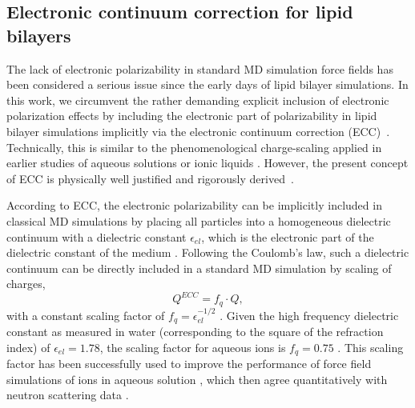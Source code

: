 \documentclass[aip,jcp,twocolumn]{revtex4}
\begin{document}
\subsection{Electronic continuum correction for lipid bilayers}\label{section:ecc}
The lack of electronic polarizability in standard MD simulation
force fields has been considered a serious issue since the early days of
lipid bilayer simulations.
In this work, we circumvent the rather demanding explicit inclusion
of electronic polarization effects \cite{lucas12,chowdhary13} by
including the electronic part of polarizability in lipid
bilayer simulations implicitly via 
the electronic continuum correction (ECC)~\cite{leontyev11}. 
Technically, this is similar to the phenomenological charge-scaling applied in 
earlier studies of aqueous solutions or ionic liquids \cite{jonsson86,egberts94,beichel14}.
However, the present concept of ECC is
physically well justified and rigorously derived~\cite{leontyev09, leontyev10, leontyev11, leontyev14}.


According to ECC, the electronic
polarizability can be implicitly included in classical MD simulations by
placing all particles into a homogeneous dielectric continuum 
with a dielectric constant $\epsilon _{el}$, 
which is the electronic part of the dielectric constant of 
the medium \cite{leontyev11}. 
Following the Coulomb's law, such a dielectric continuum can be 
directly included in a standard MD simulation by
scaling of charges,
\begin{equation}
  Q^{ECC} = f_q \cdot Q ,
\end{equation}
with a constant scaling factor of $f_q = \epsilon _{el} ^{-1/2}$ 
. 
Given the  high frequency dielectric constant as measured in water (corresponding to the square of the refraction index) of  $\epsilon _{el} = 1.78$,  
the scaling factor for aqueous ions is $f_q = 0.75$ \cite{some_orig_source, leontyev11}. This scaling factor has been
successfully used to improve the performance of force field simulations of ions in aqueous solution \cite{kohagen14,kohagen16,??},
which then agree quantitatively with neutron scattering data \cite{kohagen14,kohagen16, Pluharova2014}. 
\end{document}
